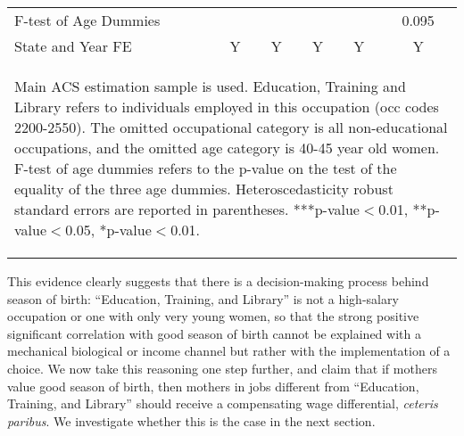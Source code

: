 \documentclass[a4paper, 12 pt]{article}
\theoremstyle{plain}
\begin{document}
\begin{doublespace}
\begin{table}[htbp]
{\begin{tabular}{l*{6}{c}}
F-test of Age Dummies&  &  &    &     &     &0.095\\
State and Year FE&&Y&Y&Y&Y&Y\\                        \bottomrule
\multicolumn{7}{p{19cm}}{\begin{footnotesize}Main ACS estimation
sample is used. Education, Training and Library refers to individuals
 employed in this occupation (occ codes 2200-2550).  The omitted
occupational category is all non-educational occupations, and the
omitted age category is 40-45 year old women. F-test of age dummies
refers to the p-value on the test of the equality of the three age
dummies.  Heteroscedasticity robust standard errors are reported in              parentheses. ***p-value$<$0.01, **p-value$<$0.05, *p-value$<$0.01.
\end{footnotesize}}\end{tabular}}\end{table}


This evidence clearly suggests that there is a decision-making process behind season of birth: ``Education, Training, and Library'' is not a high-salary occupation or one with only very young women, so that the strong positive significant correlation with good season of birth cannot be explained with a mechanical biological or income channel but rather with the implementation of a choice. We now take this reasoning one step further, and claim that if mothers value good season of birth, then mothers in jobs different from ``Education, Training, and Library'' should receive a compensating wage differential, \emph{ceteris paribus}. We investigate whether this is the case in the next section.




\end{doublespace}
\end{document}
